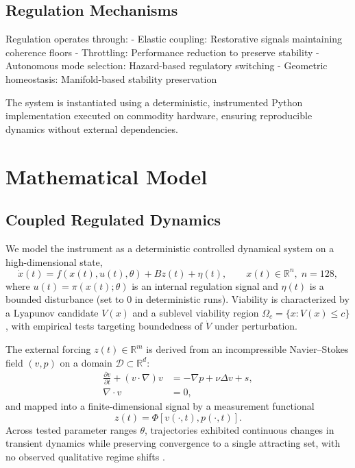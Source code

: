 \documentclass[12pt,a4paper]{article}
\begin{document}
\subsection{Regulation Mechanisms}

Regulation operates through:
- Elastic coupling: Restorative signals maintaining coherence floors
- Throttling: Performance reduction to preserve stability
- Autonomous mode selection: Hazard-based regulatory switching
- Geometric homeostasis: Manifold-based stability preservation

The system is instantiated using a deterministic, instrumented Python implementation executed on commodity hardware, ensuring reproducible dynamics without external dependencies.

\section{Mathematical Model}

\subsection{Coupled Regulated Dynamics}

We model the instrument as a deterministic controlled dynamical system on a high-dimensional state,
\begin{equation}
\dot{x}(t)= f(x(t),u(t),\theta) + B z(t) + \eta(t), \qquad x(t)\in\mathbb{R}^{n},\; n=128,
\end{equation}
where $u(t)=\pi(x(t);\theta)$ is an internal regulation signal and $\eta(t)$ is a bounded disturbance (set to $0$ in deterministic runs). Viability is characterized by a Lyapunov candidate $V(x)$ and a sublevel viability region $\Omega_c=\{x:V(x)\le c\}$, with empirical tests targeting boundedness of $\dot V$ under perturbation.

The external forcing $z(t)\in\mathbb{R}^m$ is derived from an incompressible Navier--Stokes field $(v,p)$ on a domain $\mathcal{D}\subset\mathbb{R}^d$:
\begin{align}
\frac{\partial v}{\partial t} + (v\cdot\nabla)v &= -\nabla p + \nu \Delta v + s,\\
\nabla\cdot v &= 0,
\end{align}
and mapped into a finite-dimensional signal by a measurement functional
\begin{equation}
z(t)=\Phi[v(\cdot,t),p(\cdot,t)].
\end{equation}
Across tested parameter ranges $\theta$, trajectories exhibited continuous changes in transient dynamics while preserving convergence to a single attracting set, with no observed qualitative regime shifts \cite{landau1987fluid}.
\end{document}

